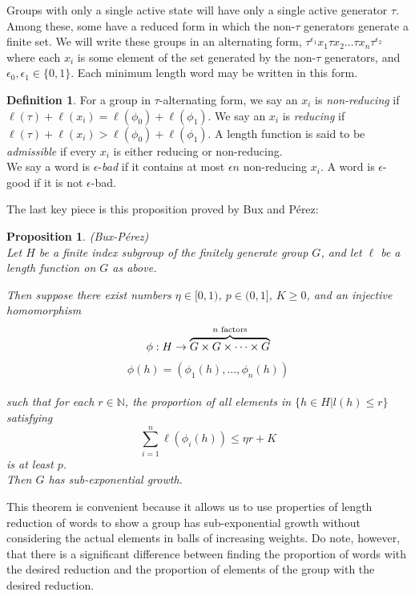 \documentclass[11pt]{amsart}
\newtheorem{proposition}[theorem]{Proposition}
\theoremstyle{definition}
\newtheorem{definition}[theorem]{Definition}
\theoremstyle{remark}
\numberwithin{equation}{section}
\begin{document}
\indent Groups with only a single active state will have only a single active generator $\tau$. Among these, some have a reduced form in which the non-$\tau$ generators generate a finite set. We will write these groups in an alternating form, $\tau^{\epsilon_1}x_1\tau x_2\ldots \tau x_n \tau^{\epsilon_2}$ where each $x_i$ is some element of the set generated by the non-$\tau$ generators, and $\epsilon_0,\epsilon_1\in \{0,1\}$. Each minimum length word may be written in this form.\\

\begin{definition}
For a group in $\tau$-alternating form, we say an $x_i$ is \textit{non-reducing} if  
$\ell(\tau)+\ell(x_i)=\ell(\phi_0)+\ell(\phi_1)$. We say an $x_i$ is \textit{reducing} if $\ell(\tau)+\ell(x_i)>\ell(\phi_0)+\ell(\phi_1)$. A length function is said to be \textit{admissible} if every $x_i$ is either reducing or non-reducing.\\

We say a word is $\mathit{\epsilon}$-\textit{bad} if it contains at most $\epsilon n$ non-reducing $x_i$. A word is $\epsilon$-good if it is not $\epsilon$-bad.\end{definition}


\indent The last key piece is this proposition proved by Bux and P\'{e}rez:
\begin{proposition}\label{PropBP}(Bux-P\'{e}rez) \cite{BuxP}\\
\indent Let $H$ be a finite index subgroup of the finitely generate group $G$, and let $\ell$ be a length function on $G$ as above. 




\indent Then suppose there exist numbers $\eta\in[0,1)$, $p\in (0,1]$, $K\geq 0$, and an injective homomorphism $$\phi: H\to \overbrace{G\times G \times\cdots\times G}^{n \text{\space}\mathrm{factors}}$$ $$\phi(h)=(\phi_1(h),...,\phi_n(h))$$\\ such that for each $r\in \mathbb{N}$, the proportion of all elements in $\{h\in H|l(h)\leq r\}$ satisfying $$\sum_{i=1}^n \ell(\phi_i(h))\leq \eta r+K$$ is at least $p$.\\
\indent Then $G$ has sub-exponential growth.\\
\end{proposition}

\indent This theorem is convenient because it allows us to use properties of length reduction of words to show a group has sub-exponential growth without considering the actual elements in balls of increasing weights. Do note, however, that there is a significant difference between finding the proportion of words with the desired reduction and the proportion of elements of the group with the desired reduction.\\
\end{document}
